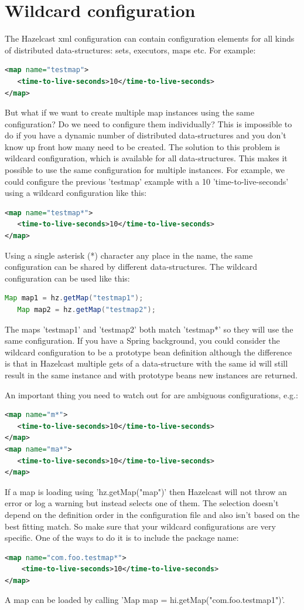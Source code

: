 \section{Wildcard configuration}
The Hazelcast xml configuration can contain configuration elements for all kinds of distributed data-structures: sets, executors, maps etc. For example:
\begin{lstlisting}[language=xml]
<map name="testmap">
   <time-to-live-seconds>10</time-to-live-seconds>
</map>
\end{lstlisting}
But what if we want to create multiple map instances using the same configuration? Do we need to configure them individually? This is impossible to do if you have a dynamic number of distributed data-structures and you don't know up front how many need to be created. The solution to this problem is wildcard configuration, which is available for all data-structures. This makes it possible to use the same configuration for multiple instances. For example, we could configure the previous 'testmap' example with a 10 'time-to-live-seconds' using a wildcard configuration like this:
\begin{lstlisting}[language=xml]
<map name="testmap*">
   <time-to-live-seconds>10</time-to-live-seconds>
</map>
\end{lstlisting}
Using a single asterisk (*) character any place in the name, the same configuration can be shared by different  data-structures. The wildcard configuration can be used like this:
\begin{lstlisting}[language=java]
   Map map1 = hz.getMap("testmap1");
   Map map2 = hz.getMap("testmap2");
\end{lstlisting}
The maps 'testmap1' and 'testmap2' both match 'testmap*' so they will use the same configuration. If you have a Spring background, you could consider the wildcard configuration to be a prototype bean definition although the difference is that in Hazelcast multiple gets of a data-structure with the same id will still result in the same instance and with prototype beans new instances are returned.

An important thing you need to watch out for are ambiguous configurations, e.g.:
\begin{lstlisting}[language=xml]
<map name="m*">
   <time-to-live-seconds>10</time-to-live-seconds>
</map>
<map name="ma*">
   <time-to-live-seconds>10</time-to-live-seconds>
</map>
\end{lstlisting}
If a map is loading using 'hz.getMap("map")' then Hazelcast will not throw an error or log a warning but instead selects one of them. The selection doesn't depend on the definition order in the configuration file and also isn't based on the best fitting match. So make sure that your wildcard configurations are very specific. One of the ways to do it is to include the package name:
\begin{lstlisting}[language=xml]
<map name="com.foo.testmap*">
    <time-to-live-seconds>10</time-to-live-seconds>
</map>
\end{lstlisting}
A map can be loaded by calling 'Map map = hi.getMap("com.foo.testmap1")'. 

